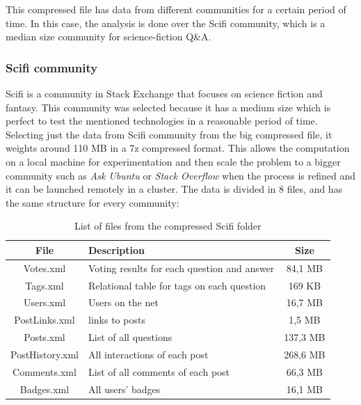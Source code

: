 \documentclass[11pt]{article} %
\begin{document}
    This compressed file has data from different communities for a certain period of time. In this case, the analysis is done over the Scifi community, which is a median size community for science-fiction Q\&A.

    \subsubsection{Scifi community}

    Scifi is a community in Stack Exchange that focuses on science fiction and fantasy. This community was selected because it has a medium size which is perfect to test the mentioned technologies in a reasonable period of time. Selecting just the data from Scifi community from the big compressed file, it weights around 110 MB in a 7z compressed format. This allows the computation on a local machine for experimentation and then scale the problem to a bigger community such as \emph{Ask Ubuntu} or \emph{Stack Overflow} when the process is refined and it can be launched remotely in a cluster. The data is divided in 8 files, and has the same structure for every community:

    \begin{table}[!ht]
      \centering
      \begin{tabular}{|c|p{}|c|}
        \hline

        File & Description & Size \\ \hline
        Votes.xml & Voting results for each question and answer & 84,1 MB \\ \hline
        Tags.xml & Relational table for tags on each question & 169 KB \\ \hline
        Users.xml & Users on the net & 16,7 MB \\ \hline
        PostLinks.xml & links to posts & 1,5 MB \\ \hline
        Posts.xml & List of all questions & 137,3 MB \\ \hline
        PostHistory.xml & All interactions of each post & 268,6 MB \\ \hline
        Comments.xml & List of all comments of each post & 66,3 MB \\ \hline
        Badges.xml & All users' badges & 16,1 MB \\

        \hline
      \end{tabular}
      \caption{List of files from the compressed Scifi folder}
      \label{tab:list_of_files}
    \end{table}
\end{document}
